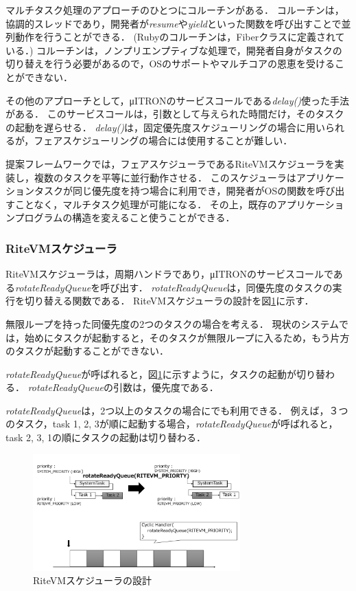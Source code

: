 \documentclass[submit,techrep]{ipsj}
\begin{document}
マルチタスク処理のアプローチのひとつにコルーチンがある．
コルーチンは，協調的スレッドであり，開発者が{\it resume}や{\it yield}といった関数を呼び出すことで並列動作を行うことができる．
(Rubyのコルーチンは，Fiberクラス\cite{url:co-routine}に定義されている．)
コルーチンは，ノンプリエンプティブな処理で，開発者自身がタスクの切り替えを行う必要があるので，OSのサポートやマルチコアの恩恵を受けることができない．

その他のアプローチとして，μITRONのサービスコールである{\it delay()}使った手法がある．
このサービスコールは，引数として与えられた時間だけ，そのタスクの起動を遅らせる．
{\it delay()}は，固定優先度スケジューリングの場合に用いられるが，フェアスケジューリングの場合には使用することが難しい．

提案フレームワークでは，フェアスケジューラであるRiteVMスケジューラを実装し，複数のタスクを平等に並行動作させる．
このスケジューラはアプリケーションタスクが同じ優先度を持つ場合に利用でき，開発者がOSの関数を呼び出すことなく，マルチタスク処理が可能になる．
その上，既存のアプリケーションプログラムの構造を変えること使うことができる． 

\subsubsection{RiteVMスケジューラ}
RiteVMスケジューラは，周期ハンドラであり，μITRONのサービスコールである{\it rotateReadyQueue}を呼び出す．
{\it rotateReadyQueue}は，同優先度のタスクの実行を切り替える関数である．
RiteVMスケジューラの設計を図\ref{fig:rotateReadyQueue}に示す．

無限ループを持った同優先度の2つのタスクの場合を考える．
現状のシステムでは，始めにタスクが起動すると，そのタスクが無限ループに入るため，もう片方のタスクが起動することができない．

{\it rotateReadyQueue}が呼ばれると，図\ref{fig:rotateReadyQueue}に示すように，タスクの起動が切り替わる．
{\it rotateReadyQueue}の引数は，優先度である．

{\it rotateReadyQueue}は，2つ以上のタスクの場合にでも利用できる．
例えば，３つのタスク，task 1, 2, 3が順に起動する場合，{\it rotateReadyQueue}が呼ばれると，task 2, 3, 1の順にタスクの起動は切り替わる．

\begin{figure}[t]
    \centering
    \includegraphics[width=8cm,clip]{../EMSOFT2016/figure/rotateReadyQueue.pdf}
    \caption{RiteVMスケジューラの設計}
    \label{fig:rotateReadyQueue}
\end{figure} 
 
\end{document}
